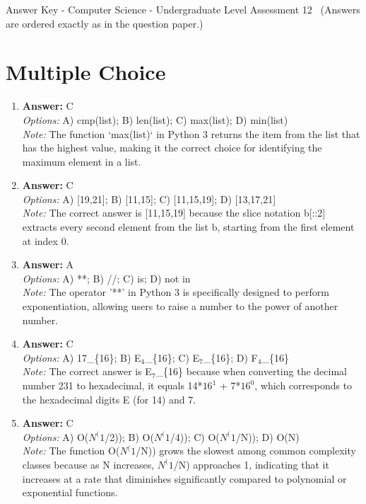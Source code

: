 \documentclass[12pt]{article}
\begin{document}
\begin{center}
Answer Key - Computer Science - Undergraduate Level Assessment 12 \
\small (Answers are ordered exactly as in the question paper.)
\end{center}

\section*{Multiple Choice}
\begin{enumerate}[label=\arabic*.]
\item \textbf{Answer:} C
\\ \textit{Options:} A) cmp(list); B) len(list); C) max(list); D) min(list)
\\ \textit{Note:} The function `max(list)` in Python 3 returns the item from the list that has the highest value, making it the correct choice for identifying the maximum element in a list.
\item \textbf{Answer:} C
\\ \textit{Options:} A) [19,21]; B) [11,15]; C) [11,15,19]; D) [13,17,21]
\\ \textit{Note:} The correct answer is [11,15,19] because the slice notation b[::2] extracts every second element from the list b, starting from the first element at index 0.
\item \textbf{Answer:} A
\\ \textit{Options:} A) **; B) //; C) is; D) not in
\\ \textit{Note:} The operator '**' in Python 3 is specifically designed to perform exponentiation, allowing users to raise a number to the power of another number.
\item \textbf{Answer:} C
\\ \textit{Options:} A) 17\_\{16\}; B) E$_{4}$\_\{16\}; C) E$_{7}$\_\{16\}; D) F$_{4}$\_\{16\}
\\ \textit{Note:} The correct answer is E$_{7}$\_\{16\} because when converting the decimal number 231 to hexadecimal, it equals 14*$16^1$ + 7*$16^0$, which corresponds to the hexadecimal digits E (for 14) and 7.
\item \textbf{Answer:} C
\\ \textit{Options:} A) O($N^(1$/2)); B) O($N^(1$/4)); C) O($N^(1$/N)); D) O(N)
\\ \textit{Note:} The function O($N^(1$/N)) grows the slowest among common complexity classes because as N increases, $N^(1$/N) approaches 1, indicating that it increases at a rate that diminishes significantly compared to polynomial or exponential functions.
\end{enumerate}
\end{document}
